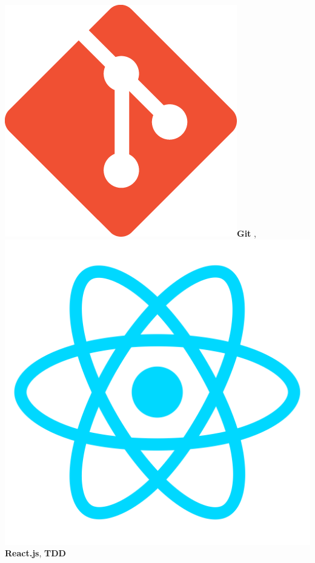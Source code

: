 \documentclass[a4paper]{friggeri-cv}
\begin{document}
\begin{aside}
{        \includegraphics[scale=0.025]{../assets/images/logos/Git_logo.png}\textbf{Git} ,
        \includegraphics[scale=0.017]{../assets/images/logos/Reactjs_logo.png}\textbf{React.js},
        \textbf{TDD}
        }
        ~

\end{aside}
\end{document}
